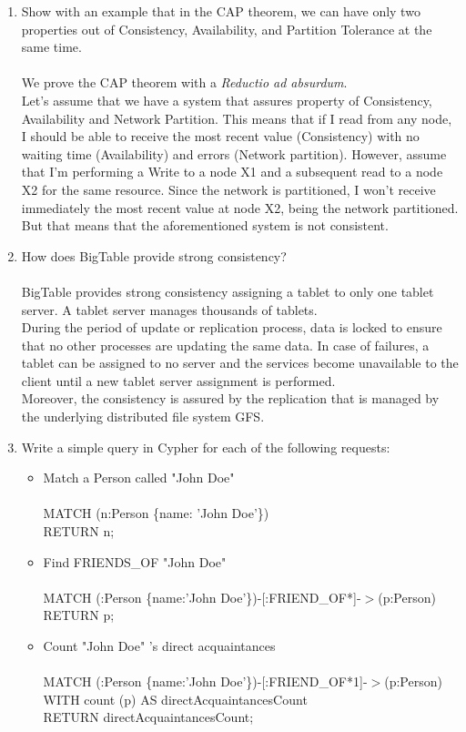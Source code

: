 \documentclass[]{report}
\begin{document}
\begin{enumerate}
 
 \item Show with an example that in the CAP theorem, we can have only two properties out of Consistency, Availability, and Partition Tolerance at the same time.\\\\
We prove the CAP theorem with a \textit{Reductio ad absurdum}.\\
Let's assume that we have a system that assures property of Consistency, Availability and Network Partition. This means that if I read from any node, I should be able to receive the most recent value (Consistency) with no waiting time (Availability) and errors (Network partition).
However, assume that I'm performing a Write to a node X1 and a subsequent read to a node X2 for the same resource. Since the network is partitioned, I won't receive immediately the most recent value at node X2, being the network partitioned. But that means that the aforementioned system is not consistent. 
 
 \item How does BigTable provide strong consistency?\\\\
BigTable provides strong consistency assigning a tablet to only one tablet server. A tablet server manages thousands of tablets.\\
During the period of update or replication process, data is locked to ensure that no other processes are updating the same data. In case of failures, a tablet can be assigned to no server and the services become unavailable to the client until a new tablet server assignment is performed.\\ Moreover, the consistency is assured by the replication that is managed by the underlying distributed file system GFS. 
 \item Write a simple query in Cypher for each of the following requests:
 \begin{itemize}
    	\item Match a Person called "John Doe"\\\\
	MATCH (n:Person \{name: 'John Doe'\})\\
        RETURN n;\\
        \item Find FRIENDS\_OF "John Doe"\\\\
        MATCH (:Person \{name:'John Doe'\})-[:FRIEND\_OF*]-$>$(p:Person)\\
        RETURN p;\\
        \item Count "John Doe" 's direct acquaintances\\\\
     	MATCH (:Person \{name:'John Doe'\})-[:FRIEND\_OF*1]-$>$(p:Person)\\
	WITH count (p) AS directAcquaintancesCount\\
        RETURN directAcquaintancesCount;\\
  \end{itemize}

\end{enumerate}
\end{document}
